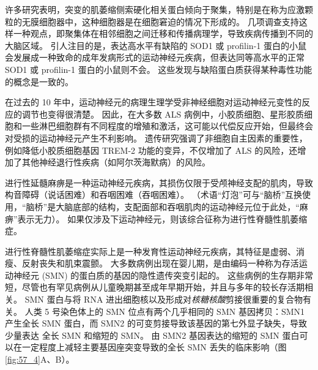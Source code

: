 许多研究表明，突变的肌萎缩侧索硬化相关蛋白倾向于聚集，特别是在称为应激颗粒的无膜细胞器中，这种细胞器是在细胞窘迫的情况下形成的。
几项调查支持这样一种观点，即聚集体在相邻细胞之间迁移和传播病理学，导致疾病传播到不同的大脑区域。
引人注目的是，表达高水平有缺陷的 SOD1 或 profilin-1 蛋白的小鼠会发展成一种致命的成年发病形式的运动神经元疾病，但表达同等高水平的正常 SOD1 或 profilin-1 蛋白的小鼠则不会。
这些发现与缺陷蛋白质获得某种毒性功能的概念是一致的。


在过去的 10 年中，运动神经元的病理生理学受非神经细胞对运动神经元变性的反应的调节也变得很清楚。
因此，在大多数 ALS 病例中，小胶质细胞、星形胶质细胞和一些淋巴细胞群有不同程度的增殖和激活，这可能以代偿反应开始，但最终会对受损的运动神经元产生不利影响。
遗传研究强调了非细胞自主因素的重要性，例如降低小胶质细胞基因 TREM-2 功能的变异，不仅增加了 ALS 的风险，还增加了其他神经退行性疾病（如阿尔茨海默病）的风险。


进行性延髓麻痹是一种运动神经元疾病，其损伤仅限于受颅神经支配的肌肉，导致构音障碍（说话困难）和吞咽困难（吞咽困难）。 
（术语“灯泡”可与“脑桥”互换使用，“脑桥”是大脑底部的结构，支配面部和吞咽肌肉的运动神经元位于此处，“麻痹”表示无力）。
如果仅涉及下运动神经元，则该综合征称为进行性脊髓性肌萎缩症。


进行性脊髓性肌萎缩症实际上是一种发育性运动神经元疾病，其特征是虚弱、消瘦、反射丧失和肌束震颤。
大多数病例出现在婴儿期，是由编码一种称为存活运动神经元 (SMN) 的蛋白质的基因的隐性遗传突变引起的。
这些病例的生存期非常短，尽管也有罕见病例从儿童晚期甚至成年早期开始，并且与多年的较长存活期相关。
SMN 蛋白与将 RNA 进出细胞核以及形成对\textit{核糖核酸}剪接很重要的复合物有关。
人类 5 号染色体上的 SMN 位点有两个几乎相同的 SMN 基因拷贝：SMN1 产生全长 SMN 蛋白，而 SMN2 的可变剪接导致该基因的第七外显子缺失，导致少量表达 全长 SMN 和缩短的 SMN。
由 SMN2 基因表达的缩短的 SMN 蛋白可以在一定程度上减轻主要基因座突变导致的全长 SMN 丢失的临床影响（图 \ref{fig:57_4}A、B）。


